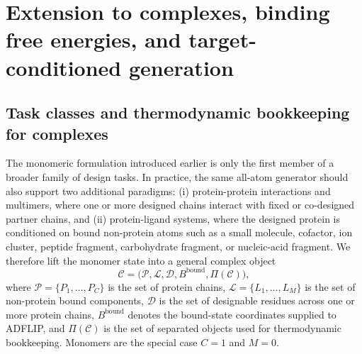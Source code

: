 \documentclass[11pt]{article}
\begin{document}
\section{Extension to complexes, binding free energies, and target-conditioned generation}
\label{sec:complexext}

\subsection{Task classes and thermodynamic bookkeeping for complexes}

The monomeric formulation introduced earlier is only the first member of a broader family of design tasks. In practice, the same all-atom generator should also support two additional paradigms: (i) protein-protein interactions and multimers, where one or more designed chains interact with fixed or co-designed partner chains, and (ii) protein-ligand systems, where the designed protein is conditioned on bound non-protein atoms such as a small molecule, cofactor, ion cluster, peptide fragment, carbohydrate fragment, or nucleic-acid fragment. We therefore lift the monomer state into a general complex object
\begin{equation}
    \mathcal{C}=\big(\mathcal{P},\mathcal{L},\mathcal{D},B^{\mathrm{bound}},\Pi(\mathcal{C})\big),
\end{equation}
where $\mathcal{P}=\{P_1,\ldots,P_C\}$ is the set of protein chains, $\mathcal{L}=\{L_1,\ldots,L_M\}$ is the set of non-protein bound components, $\mathcal{D}$ is the set of designable residues across one or more protein chains, $B^{\mathrm{bound}}$ denotes the bound-state coordinates supplied to ADFLIP, and $\Pi(\mathcal{C})$ is the set of separated objects used for thermodynamic bookkeeping. Monomers are the special case $C=1$ and $M=0$.
\end{document}
